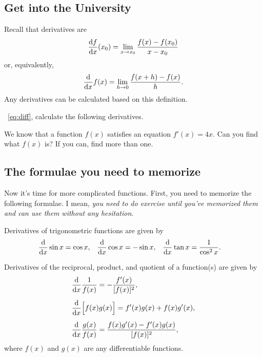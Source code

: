 \documentclass[11pt,pdfa,lastpage]{MishoNote}
\begin{document}
\subsection{Get into the University}
Recall that derivatives are 
\begin{equation*}
\diff{f}{x}(x_0)=\lim_{x\to x_0}\frac{f(x)-f(x_0)}{x-x_0}
\end{equation*}
or, equivalently,
\begin{equation}
\diff{}{x}f(x)=\lim_{h\to 0}\frac{f(x+h)-f(x)}{h}.\label{eq:diff}
\end{equation}
Any derivatives can be calculated based on this definition.


\begin{problems}
\Problem[S]\relax
  ~\eqref{eq:diff}, calculate the following derivatives.
  \begin{menumerate}{3}
  \end{menumerate}
 \Problem[S] We know that a function $f(x)$ satisfies an equation $f'(x)=4x$. Can you find what $f(x)$ is? If you can, find more than one.
\end{problems}

\subsection{The formulae you need to memorize}
Now it's time for more complicated functions. First, you need to memorize the following formulae.
I mean, \emph{you need to do exercise until you've memorized them and can use them without any hesitation}.

\begin{theorem}{}{}
  Derivatives of trigonometric functions are given by
  \begin{align}
   \diff{}{x}\sin x &= \cos x,&
   \diff{}{x}\cos x &= -\sin x,&
   \diff{}{x}\tan x &= \frac1{\cos^2x}.
  \end{align}
\end{theorem}
\begin{theorem}{}{}
  Derivatives of the reciprocal, product, and quotient of a function(s) are given by
  \begin{align}
   &\label{eq:reci} \diff{}{x}\frac{1}{f(x)}=-\frac{f'(x)}{[f(x)]^2},\\[0.5em]
   &\label{eq:prod} \diff{}{x}\Bigl[f(x)g(x)\Bigr]=f'(x)g(x)+f(x)g'(x),\\[0.5em]
   &\label{eq:quot} \diff{}{x}\frac{g(x)}{f(x)}=\frac{f(x)g'(x)-f'(x)g(x)}{[f(x)]^2},
   \end{align}
   where  $f(x)$ and $g(x)$ are any differentiable functions.
\end{theorem}
\end{document}
